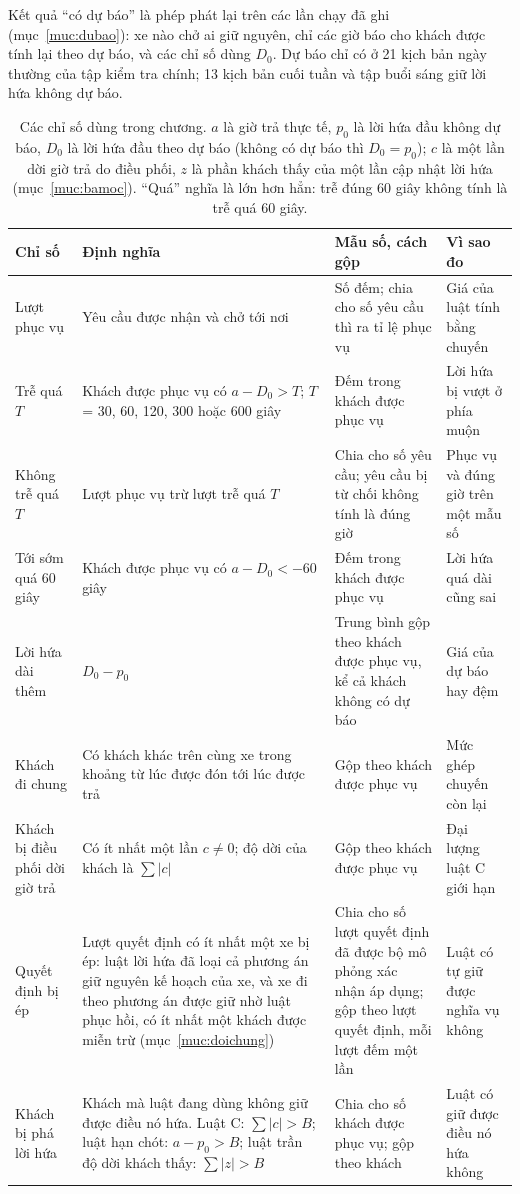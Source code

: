 Kết quả ``có dự báo'' là phép phát lại trên các lần chạy đã ghi (mục~\ref{muc:dubao}): xe nào chở ai giữ nguyên, chỉ
các giờ báo cho khách được tính lại theo dự báo, và các chỉ số dùng $D_0$. Dự báo chỉ có ở 21 kịch bản ngày thường của
tập kiểm tra chính; 13 kịch bản cuối tuần và tập buổi sáng giữ lời hứa không dự báo.

\begin{table}[htbp]
\centering
\caption{Các chỉ số dùng trong chương. $a$ là giờ trả thực tế, $p_0$ là lời hứa đầu không dự báo, $D_0$
là lời hứa đầu theo dự báo (không có dự báo thì $D_0 = p_0$); $c$ là một lần dời giờ trả do điều phối, $z$ là phần
khách thấy của một lần cập nhật lời hứa (mục~\ref{muc:bamoc}). ``Quá'' nghĩa là lớn hơn hẳn: trễ đúng 60 giây
không tính là trễ quá 60 giây.}
\label{bang:c4-chiso}
\footnotesize
\setlength{\tabcolsep}{3pt}
\begin{tabular}{@{}p{2.7cm}p{5.3cm}p{3.5cm}p{3.5cm}@{}}
\toprule
\textbf{Chỉ số} & \textbf{Định nghĩa} & \textbf{Mẫu số, cách gộp} & \textbf{Vì sao đo}\\
\midrule
Lượt phục vụ & Yêu cầu được nhận và chở tới nơi & Số đếm; chia cho số yêu cầu thì ra tỉ lệ phục vụ & Giá của
luật tính bằng chuyến\\
Trễ quá $T$ & Khách được phục vụ có $a - D_0 > T$; $T$ = 30, 60, 120, 300 hoặc 600 giây & Đếm trong khách
được phục vụ & Lời hứa bị vượt ở phía muộn\\
Không trễ quá $T$ & Lượt phục vụ trừ lượt trễ quá $T$ & Chia cho số yêu cầu; yêu cầu bị từ chối không
tính là đúng giờ & Phục vụ và đúng giờ trên một mẫu số\\
Tới sớm quá 60 giây & Khách được phục vụ có $a - D_0 < -60$ giây & Đếm trong khách được phục vụ & Lời
hứa quá dài cũng sai\\
Lời hứa dài thêm & $D_0 - p_0$ & Trung bình gộp theo khách được phục vụ, kể cả khách không có dự báo & Giá của
dự báo hay đệm\\
Khách đi chung & Có khách khác trên cùng xe trong khoảng từ lúc được đón tới lúc được trả & Gộp theo
khách được phục vụ & Mức ghép chuyến còn lại\\
Khách bị điều phối dời giờ trả & Có ít nhất một lần $c \neq 0$; độ dời của khách là $\sum|c|$ &
Gộp theo khách được phục vụ & Đại lượng luật C giới hạn\\
Quyết định bị ép & Lượt quyết định có ít nhất một xe bị ép: luật lời hứa đã loại cả phương án giữ nguyên kế hoạch
của xe, và xe đi theo phương án được giữ nhờ luật phục hồi, có ít nhất một khách được miễn trừ
(mục~\ref{muc:doichung}) & Chia cho số lượt quyết định đã được bộ mô phỏng xác nhận áp dụng; gộp theo
lượt quyết định, mỗi lượt đếm một lần & Luật có tự giữ được nghĩa vụ không\\
Khách bị phá lời hứa & Khách mà luật đang dùng không giữ được điều nó hứa. Luật C: $\sum|c| > B$; luật hạn chót:
$a - p_0 > B$; luật trần độ dời khách thấy: $\sum|z| > B$ & Chia cho số khách được phục vụ; gộp theo
khách & Luật có giữ được điều nó hứa không\\
\bottomrule
\end{tabular}
\end{table}
